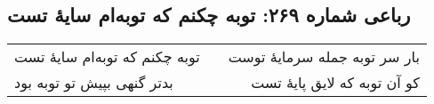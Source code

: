 \begin{center}
\section*{رباعی شماره ۲۶۹: توبه چکنم که توبه‌ام سایهٔ تست}
\label{sec:0269}
\begin{longtable}{l p{0.5cm} r}
توبه چکنم که توبه‌ام سایهٔ تست
&&
بار سر توبه جمله سرمایهٔ توست
\\
بدتر گنهی بپیش تو توبه بود
&&
کو آن توبه که لایق پایهٔ تست
\\
\end{longtable}
\end{center}
